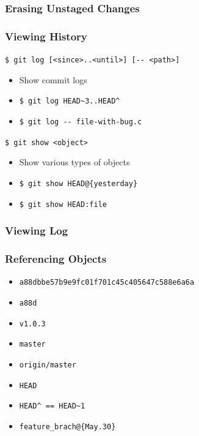 \documentclass[english,compress]{beamer}
\begin{document}
\begin{frame}[fragile]
    \frametitle{Erasing Unstaged Changes}
\end{frame}

\begin{frame}[fragile]
    \frametitle{Viewing History}

    \verb|$ git log [<since>..<until>] [-- <path>]|
    \begin{itemize}
        \item Show commit logs
        \item \verb|$ git log HEAD~3..HEAD^|
        \item \verb|$ git log -- file-with-bug.c|
    \end{itemize}

    \verb|$ git show <object>|
    \begin{itemize}
        \item Show various types of objects
        \item \verb|$ git show HEAD@{yesterday}|
        \item \verb|$ git show HEAD:file|
    \end{itemize}
\end{frame}

\begin{frame}[fragile]
    \frametitle{Viewing Log}
\end{frame}

\begin{frame}[fragile]
    \frametitle{Referencing Objects}

    \begin{itemize}
        \item \verb|a88dbbe57b9e9fc01f701c45c405647c588e6a6a|
        \item \verb|a88d|
        \item \verb|v1.0.3|
        \item \verb|master|
        \item \verb|origin/master|
        \item \verb|HEAD|
        \item \verb|HEAD^ == HEAD~1|
        \item \verb|feature_brach@{May.30}|
    \end{itemize}
\end{frame}
\end{document}
